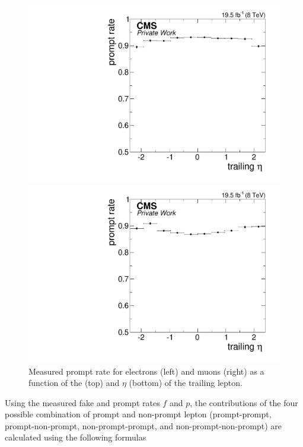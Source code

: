 \begin{figure}[htbp]
\begin{minipage}[t]{0.49\textwidth}
\includegraphics[width=\textwidth]{plots/BG/nonPrompt/promptRate_ele_Inclusive_Full2012_TrailingEta_None.pdf}
\end{minipage}
\begin{minipage}[t]{0.49\textwidth}
\includegraphics[width=\textwidth]{plots/BG/nonPrompt/promptRate_mu_Inclusive_Full2012_TrailingEta_None.pdf}
\end{minipage}
\caption{Measured prompt rate for electrons (left) and muons (right) as a function of the \pt (top) and $\eta$ (bottom) of the trailing lepton.}


\label{fig:promptRate}
\end{figure} 
Using the measured fake and prompt rates $f$ and $p$, the contributions of the four possible combination of prompt and non-prompt lepton (prompt-prompt, prompt-non-prompt, non-prompt-prompt, and non-prompt-non-prompt) are calculated using the following formulas
